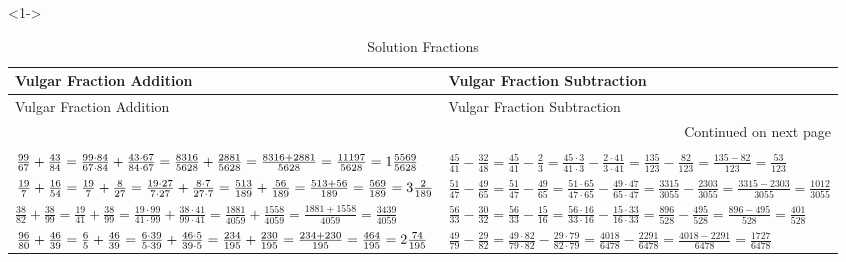 \documentclass[ngerman,xcolor={table,dvipsnames},smaller,compress,hyperref={bookmarks,colorlinks}]{beamer}
\begin{document}
\begin{frame}[t,fragile]

\begin{block}<1->{}

\footnotesize
\begin{longtable}[l]{p{5cm}|p{5cm}}
\toprule
Vulgar Fraction Addition & Vulgar Fraction Subtraction \\
\midrule
\endfirsthead

\toprule
Vulgar Fraction Addition & Vulgar Fraction Subtraction \\
\midrule
\endhead
\midrule
\multicolumn{2}{r}{{Continued on next page}} \\
\bottomrule
\endfoot

\caption{Solution Fractions\label{solutionvulgar_fractions_addition}}\\
\endlastfoot
$ \frac{99}{67} + \frac{43}{84} = \frac{99 \cdot 84}{67 \cdot 84} + \frac{43 \cdot 67}{84 \cdot 67} = \frac{8316}{5628} + \frac{2881}{5628} = \frac{8316 + 2881}{5628} = \frac{11197}{5628} = \normalsize{1} \frac{5569}{5628} $                             & $ \frac{45}{41} - \frac{32}{48} = \frac{45}{41} - \frac{2}{3} = \frac{45 \cdot 3}{41 \cdot 3} - \frac{2 \cdot 41}{3 \cdot 41} = \frac{135}{123} - \frac{82}{123} = \frac{135 - 82}{123} = \frac{53}{123} $                                                \\
$ \frac{19}{7} + \frac{16}{54} = \frac{19}{7} + \frac{8}{27} = \frac{19 \cdot 27}{7 \cdot 27} + \frac{8 \cdot 7}{27 \cdot 7} = \frac{513}{189} + \frac{56}{189} = \frac{513 + 56}{189} = \frac{569}{189} = \normalsize{3} \frac{2}{189} $                    & $ \frac{51}{47} - \frac{49}{65} = \frac{51}{47} - \frac{49}{65} = \frac{51 \cdot 65}{47 \cdot 65} - \frac{49 \cdot 47}{65 \cdot 47} = \frac{3315}{3055} - \frac{2303}{3055} = \frac{3315 - 2303}{3055} = \frac{1012}{3055} $                              \\
$ \frac{38}{82} + \frac{38}{99} = \frac{19}{41} + \frac{38}{99} = \frac{19 \cdot 99}{41 \cdot 99} + \frac{38 \cdot 41}{99 \cdot 41} = \frac{1881}{4059} + \frac{1558}{4059} = \frac{1881 + 1558}{4059} = \frac{3439}{4059} $                                 & $ \frac{56}{33} - \frac{30}{32} = \frac{56}{33} - \frac{15}{16} = \frac{56 \cdot 16}{33 \cdot 16} - \frac{15 \cdot 33}{16 \cdot 33} = \frac{896}{528} - \frac{495}{528} = \frac{896 - 495}{528} = \frac{401}{528} $                                       \\
$ \frac{96}{80} + \frac{46}{39} = \frac{6}{5} + \frac{46}{39} = \frac{6 \cdot 39}{5 \cdot 39} + \frac{46 \cdot 5}{39 \cdot 5} = \frac{234}{195} + \frac{230}{195} = \frac{234 + 230}{195} = \frac{464}{195} = \normalsize{2} \frac{74}{195} $                & $ \frac{49}{79} - \frac{29}{82} = \frac{49 \cdot 82}{79 \cdot 82} - \frac{29 \cdot 79}{82 \cdot 79} = \frac{4018}{6478} - \frac{2291}{6478} = \frac{4018 - 2291}{6478} = \frac{1727}{6478} $                                                              \\

\end{longtable}
\end{block}
\end{frame}
\end{document}
